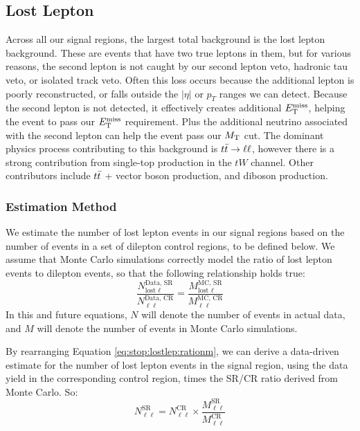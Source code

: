 \subsection{Lost Lepton}
\label{ssec:stop:lostlep}

Across all our signal regions, the largest total background
is the lost lepton background. These are events that have two true
leptons in them, but for various reasons, the second lepton is not
caught by our second lepton veto, hadronic tau veto, or isolated track
veto. Often this loss occurs because the additional lepton is poorly
reconstructed, or falls outside the $|\eta|$ or $p_T$ ranges we can
detect. Because the second lepton is not detected, it effectively
creates additional $E_\text{T}^\text{miss}$, helping the event to pass our $E_\text{T}^\text{miss}$
requirement. Plus the additional neutrino associated with the second
lepton can help the event pass our $M_\text{T}$ cut. The dominant physics
process contributing to this background is $t\bar{t} \rightarrow \ell\ell$, however there
is a strong contribution from single-top production in the $tW$
channel. Other contributors include $t\bar{t}$ + vector boson
production, and diboson production.

\subsubsection{Estimation Method}
\label{sssec:stop:lostlep:estimation}

We estimate the number of lost lepton events in our signal regions
based on the number of events in a set of dilepton control regions, to be
defined below. We assume that Monte Carlo simulations correctly model
the ratio of lost lepton events to dilepton events, so that the
following relationship holds true:
\begin{equation}
\label{eq:stop:lostlep:rationm}
\frac{N_{\text{lost }\ell}^\text{Data, SR}}{N_{\ell\ell}^\text{Data, CR}} =
\frac{M_{\text{lost }\ell}^\text{MC, SR}}{M_{\ell\ell}^\text{MC, CR}}
\end{equation}
In this and future equations, $N$ will denote the number of events in
actual data, and $M$ will denote the number of events in Monte Carlo
simulations.

By rearranging Equation \ref{eq:stop:lostlep:rationm}, we can derive
a data-driven estimate for the number of lost lepton events in the
signal region, using the data yield in the corresponding control region,
times the SR/CR ratio derived from Monte Carlo. So:
\begin{equation}
\label{eq:stop:lostlep:estimate}
N_{\ell\ell}^\text{SR} = N_{\ell\ell}^\text{CR} \times \frac{M_{\ell\ell}^\text{SR}}{M_{\ell\ell}^\text{CR}}
\end{equation}

